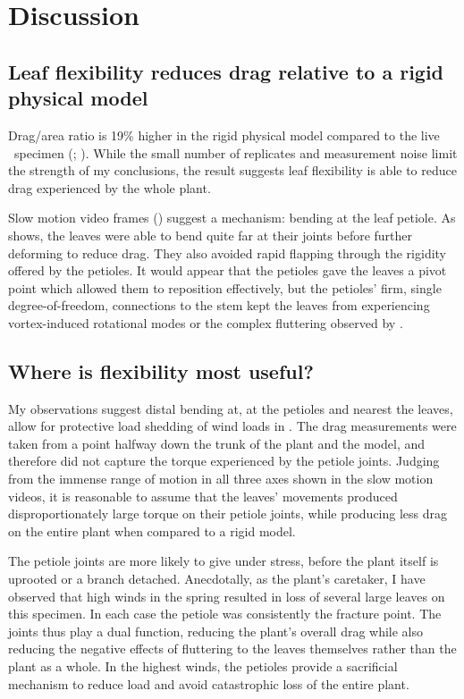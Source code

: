\section{Discussion}
\label{sec:discussion}

\subsection{Leaf flexibility reduces drag relative to a rigid physical model}
Drag/area ratio is 19\% higher in the rigid physical model compared to the live \Cxparadisi\ specimen (; ). While the small number of replicates and measurement noise limit the strength of my conclusions, the result suggests leaf flexibility is able to reduce drag experienced by the whole plant. 

Slow motion video frames () suggest a mechanism: bending at the leaf petiole. As  shows, the leaves were able to bend quite far at their joints before further deforming to reduce drag. They also avoided rapid flapping through the rigidity offered by the petioles. It would appear that the petioles gave the leaves a pivot point which allowed them to reposition effectively, but the petioles' firm, single degree-of-freedom, connections to the stem kept the leaves from experiencing vortex-induced rotational modes or the complex fluttering observed by \citet{miller2012reconfiguration}.

\subsection{Where is flexibility most useful?}
My observations suggest distal bending at, at the petioles and nearest the leaves, allow for protective load shedding of wind loads in \Cxparadisi. The drag measurements were taken from a point halfway down the trunk of the plant and the model, and therefore did not capture the torque experienced by the petiole joints. Judging from the immense range of motion in all three axes shown in the slow motion videos, it is reasonable to assume that the leaves' movements produced disproportionately large torque on their petiole joints, while producing less drag on the entire plant when compared to a rigid model. 

The petiole joints are more likely to give under stress, before the plant itself is uprooted or a branch detached. Anecdotally, as the plant's caretaker, I have observed that high winds in the spring resulted in loss of several large leaves on this specimen. In each case the petiole was consistently the fracture point. The joints thus play a dual function, reducing the plant's overall drag while also reducing the negative effects of fluttering to the leaves themselves rather than the plant as a whole. In the highest winds, the petioles provide a sacrificial mechanism to reduce load and avoid catastrophic loss of the entire plant. 
